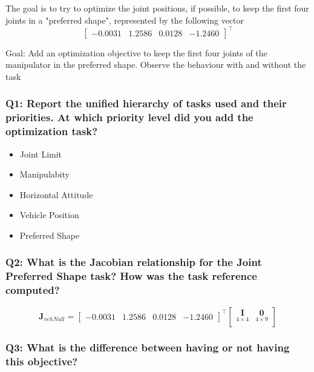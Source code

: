\documentclass{article}
\begin{document}
The goal is to try to optimize the joint positions, if possible, to keep the first four joints in a "preferred shape", represented by the following vector
\begin{displaymath}
\begin{bmatrix}-0.0031 & 1.2586 & 0.0128 & -1.2460 \end{bmatrix}^\top
\end{displaymath}

Goal: Add an optimization objective to keep the first four joints of the manipulator in the preferred shape. Observe the behaviour with and without the task

\subsubsection{Q1: Report the unified hierarchy of tasks used and their priorities. At which priority level did you add the optimization task?}

\begin{itemize}
\item Joint Limit 
\item Manipulabity 
\item Horizontal Attitude 
\item Vehicle Position
\item Preferred Shape
\end {itemize}



\subsubsection{Q2: What is the Jacobian relationship for the Joint Preferred Shape task? How was the task reference computed?}

\begin{equation}
\boldsymbol{J}_{vehNull}=
\begin{bmatrix}-0.0031 & 1.2586 & 0.0128 & -1.2460 \end{bmatrix}^\top
    \begin{bmatrix}
     \underset{4\times4}{\boldsymbol{I}} & \underset{4\times9}{\boldsymbol{0}} \\
    \end{bmatrix}
\end{equation}

\subsubsection{Q3: What is the difference between having or not having this objective?}
\end{document}
